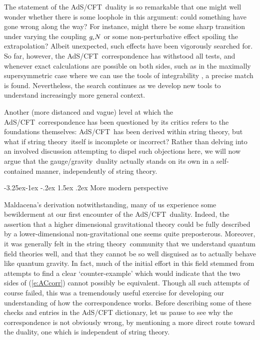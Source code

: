 \documentclass[12pt]{article}
\makeatletter
\renewcommand\subsection{\@startsection{subsection}{2}{\z@}%
                                     {-3.25ex\@plus -1ex \@minus -.2ex}%
                                     {1.5ex \@plus .2ex}%
                                     {\normalfont\bfseries}}
\def\req#1{(\ref{#1})}
\def\AC{AdS/CFT}
\def\GG{gauge/gravity}
\def\STY{string theory}
\def\gst{g_{\scriptscriptstyle {\rm s}}}
\makeatother
\begin{document}
The statement of the \AC\ duality is so remarkable that one might well wonder whether there is some loophole in this argument:  could something have gone wrong along the way?  For instance, might there be some sharp transition under varying the coupling $\gst N$ or some non-perturbative effect spoiling the extrapolation?  Albeit unexpected, such effects have been vigorously searched for.  So far, however, the \AC\ correspondence has withstood all tests, and whenever exact calculations are possible on both sides, such as in the maximally supersymmetric case where we can use the tools of integrability \cite{Beisert:2010jr}, a precise match is found.  Nevertheless, the search continues as we develop new tools to understand increasingly more general context.

Another (more distanced and vague) level at which the \AC\ correspondence has been questioned by its critics refers to the foundations themselves:  \AC\ has been derived within \STY, but what if \STY\ itself is incomplete or incorrect?  Rather than delving into an involved discussion attempting to dispel such objections here, we will now argue that the \GG\ duality actually stands on its own in a self-contained manner,  independently of \STY.


\subsection{More modern perspective}
\label{s:ACmodern}

Maldacena's derivation notwithstanding, many of us experience some bewilderment at our first encounter of the \AC\ duality.
Indeed, the assertion that a higher dimensional gravitational theory could be fully described by a  lower-dimensional non-gravitational one seems quite preposterous.  
Moreover, it was generally felt in the \STY\ community that we understand quantum field theories well, and that they cannot be so well disguised as  to actually behave like quantum gravity.
 In fact, much of the initial effort in this field stemmed from attempts to find a clear `counter-example' which would indicate that the two sides of \req{e:ACcorr} cannot possibly be equivalent.  Though all such attempts of course failed, this was a tremendously useful exercise for developing our understanding of how the correspondence works.
Before describing some of these checks and entries in the AdS/CFT dictionary, let us pause to see why the correspondence is not obviously wrong, by mentioning a more direct route toward the duality, one which is independent of string theory.
\end{document}
